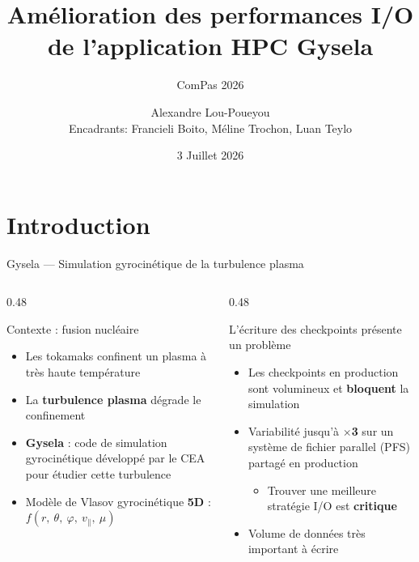 \documentclass[svgnames,9pt,aspectratio=169]{beamer}
\title[I/O Gysela]{Amélioration des performances I/O\\de l'application HPC Gysela}
\subtitle{ComPas 2026}
\date[Juillet 2026]{3 Juillet 2026}
\author[A. Lou-Poueyou]{Alexandre Lou-Poueyou\\Encadrants: Francieli Boito, Méline Trochon, Luan Teylo}
\institute{Inria Bordeaux, équipe TaDaaM \and CEA}
\begin{document}
\frame{\titlepage}

\renewcommand{\contentsname}{Plan}
\frame{\tocpage}

\section{Introduction}
\frame{\sectionpage}

\setlength{\leftmarginii}{0.5cm}

\begin{frame}{Gysela --- Simulation gyrocinétique de la turbulence plasma}

  \vspace{0.4em}

  \begin{columns}[t]
    \begin{column}{0.48\textwidth}
      \begin{block}{Contexte : fusion nucléaire}
        \begin{itemize}
          \item Les tokamaks confinent un plasma à très haute température
          \item La \textbf{turbulence plasma} dégrade le confinement
          \item \textbf{Gysela} : code de simulation gyrocinétique développé par le CEA pour étudier cette turbulence
          \item Modèle de Vlasov gyrocinétique \textbf{5D} :
                $f(r,\ \theta,\ \varphi,\ v_\parallel,\ \mu)$
        \end{itemize}
      \end{block}
    \end{column}
    \begin{column}{0.48\textwidth}
      \begin{alertblock}{L'écriture des checkpoints présente un problème}
        \begin{itemize}
          \item Les checkpoints en production sont volumineux et \textbf{bloquent} la simulation
          \item Variabilité jusqu'à \textbf{$\times$3} sur un système de fichier parallel (PFS) partagé en production
          \begin{itemize}
            \item Trouver une meilleure stratégie I/O est \textbf{critique}
          \end{itemize}
          \item Volume de données très important à écrire
        \end{itemize}
      \end{alertblock}

      \vspace{0.4em}
    \end{column}
  \end{columns}
\end{frame}
\end{document}
